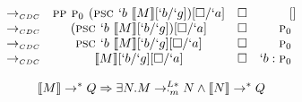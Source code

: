 \begin{Proof}
\[\begin{array}{lcrr}
  \tocdc\     & \pp \gp (\psc `b\ \tr{M}[`b/`g])[\square/`a]     & \square & []        \\
  \tocdc\     & (\psc `b\ \tr{M}[`b/`g])[\square/`a]             & \square & \gp       \\
  \tocdc\     & \psc `b\ \tr{M}[`b/`g][\square/`a]               & \square & \gp       \\
  \tocdc\     & \tr{M}[`b/`g][\square/`a]                        & \square & `b:\gp \\
\end{array}
\]
\end{Proof}

\begin{theorem}[Completeness of $\tr{`.}$]
\[
  \llbracket M \rrbracket \to^{*} Q \Rightarrow \exists N. M \to_{`m}^{L*} N \land \llbracket N \rrbracket \to^{*} Q
\]
\end{theorem}
